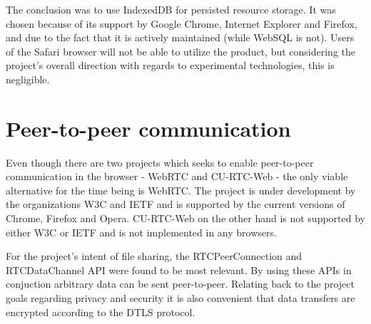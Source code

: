 The conclusion was to use IndexedDB for persisted resource storage. It was chosen because of its support by Google Chrome, Internet Explorer and Firefox, and due to the fact that it is actively maintained (while WebSQL is not). Users of the Safari browser will not be able to utilize the product, but considering the project's overall direction with regards to experimental technologies, this is negligible.

\section{Peer-to-peer communication}

Even though there are two projects which seeks to enable peer-to-peer communication in the browser - WebRTC and CU-RTC-Web - the only viable alternative for the time being is WebRTC. The project is under development by the organizations W3C and IETF and is supported by the current versions of Chrome, Firefox and Opera. CU-RTC-Web on the other hand is not supported by either W3C or IETF and is not implemented in any browsers.

For the project's intent of file sharing, the RTCPeerConnection and RTCDataChannel API were found to be most relevant. By using these APIs in conjuction arbitrary data can be sent peer-to-peer. Relating back to the project goals regarding privacy and security it is also convenient that data transfers are encrypted according to the DTLS protocol.

